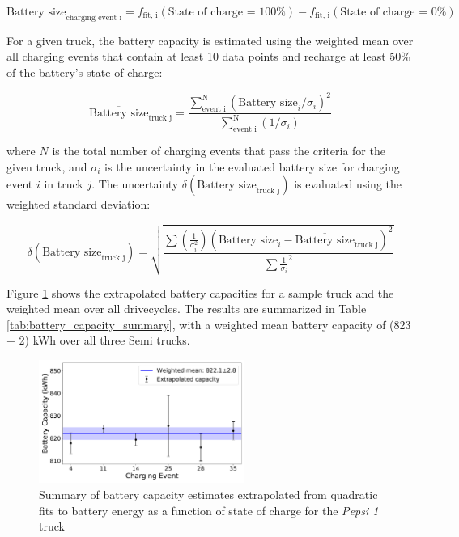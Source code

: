 \begin{equation}
    \text{Battery size}_\text{charging event i} = f_\text{fit, i}(\text{State of charge = 100\%}) - f_\text{fit, i}(\text{State of charge = 0\%})
\end{equation}

For a given truck, the battery capacity is estimated using the weighted mean over all charging events that contain at least 10 data points and recharge at least 50\% of the battery's state of charge:

\begin{equation}
    \overline{\text{Battery size}}_\text{truck j} = \frac{\sum_\text{event i}^\text{N} (\text{Battery size}_i/\sigma_i)^2}{\sum_\text{event i}^\text{N}(1/\sigma_i)}
\end{equation}

where $N$ is the total number of charging events that pass the criteria for the given truck, and $\sigma_i$ is the uncertainty in the evaluated battery size for charging event $i$ in truck $j$. The uncertainty $\delta(\text{Battery size}_\text{truck j})$ is evaluated using the weighted standard deviation:

\begin{equation}
    \delta(\text{Battery size}_\text{truck j}) = \sqrt{\frac{\sum (\frac{1}{\sigma_i^2}) (\text{Battery size}_i - \overline{\text{Battery size}}_\text{truck j})^2}{\sum \frac{1}{\sigma_i}^2}}
\end{equation}

Figure \ref{fig:battery_capacity_summary} shows the extrapolated battery capacities for a sample truck and the weighted mean over all drivecycles. The results are summarized in Table \ref{tab:battery_capacity_summary}, with a weighted mean battery capacity of (823 $\pm$ 2) kWh over all three Semi trucks.

\begin{figure}[H]
        \centering
        \includegraphics[width=0.6\textwidth]{figures/pepsi_1_battery_capacity_summary.pdf}
        \caption{Summary of battery capacity estimates extrapolated from quadratic fits to battery energy as a function of state of charge for the \textit{Pepsi 1} truck}
        \label{fig:battery_capacity_summary}
\end{figure}

